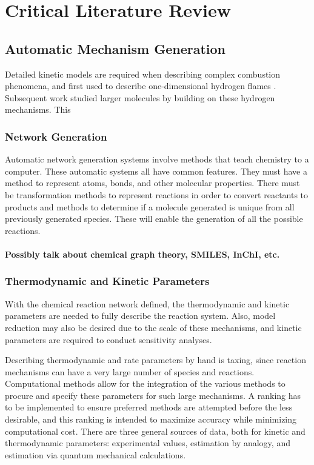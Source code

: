 \documentclass[12pt]{article}
\begin{document}
\section{Critical Literature Review}
\subsection{Automatic Mechanism Generation}

Detailed kinetic models are required when describing complex combustion phenomena, and first used to describe one-dimensional hydrogen flames \cite{DixonLewis:1967bu} \cite{DixonLewis:1970cy}. Subsequent work studied larger molecules by building on these hydrogen mechanisms. This 

\subsubsection{Network Generation}
Automatic network generation systems involve methods that teach chemistry to a computer. These automatic systems all have common features. They must have a method to represent atoms, bonds, and other molecular properties. There must be transformation methods to represent reactions in order to convert reactants to products and methods to determine if a molecule generated is unique from all previously generated species. These will enable the generation of all the possible reactions.

\paragraph{Possibly talk about chemical graph theory, SMILES, InChI, etc.}

\subsubsection{Thermodynamic and Kinetic Parameters}
With the chemical reaction network defined, the thermodynamic and kinetic parameters are needed to fully describe the reaction system. Also, model reduction may also be desired due to the scale of these mechanisms, and kinetic parameters are required to conduct sensitivity analyses.

Describing thermodynamic and rate parameters by hand is taxing, since reaction mechanisms can have a very large number of species and reactions. Computational methods allow for the integration of the various methods to procure and specify these parameters for such large mechanisms. A ranking has to be implemented to ensure preferred methods are attempted before the less desirable, and this ranking is intended to maximize accuracy while minimizing computational cost. There are three general sources of data, both for kinetic and thermodynamic parameters: experimental values, estimation by analogy, and estimation via quantum mechanical calculations.
\end{document}
